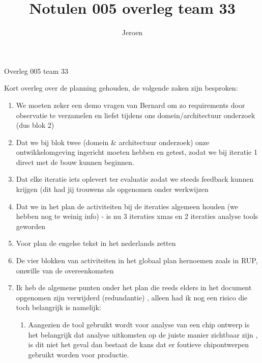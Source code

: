\documentclass{article}
\title{Notulen 005 overleg team 33}
\author{Jeroen}
\begin{document}

\begin{Minutes}{Overleg 005 team 33}

\maketitle%



Kort overleg over de planning gehouden, de volgende zaken zijn besproken:

\begin{enumerate}
 \item We moeten zeker een demo vragen van Bernard om zo requirements door observatie te verzamelen en liefst tijdens ons domein/architectuur onderzoek (dus blok 2)
 \item Dat we bij blok twee (domein \& architectuur onderzoek) onze ontwikkelomgeving ingericht moeten hebben en getest, zodat we bij iteratie 1 direct met de bouw kunnen beginnen.
 \item Dat elke iteratie iets oplevert ter evaluatie zodat we steeds feedback kunnen krijgen (dit had jij trouwens als opgenomen onder werkwijzen
 \item Dat we in het plan de activiteiten bij de iteraties algemeen houden (we hebben nog te weinig info) - is nu 3 iteraties xmas en 2 iteraties analyse tools geworden
 \item Voor plan de engelse tekst in het nederlands zetten
 \item De vier blokken van activiteiten in het globaal plan hernoemen zoals in RUP, omwille van de overeenkomsten
 \item Ik heb de algemene punten onder het plan die reeds elders in het document opgenomen zijn verwijderd (redundantie) , alleen had ik nog een risico die toch belangrijk is namelijk:
 \begin{enumerate}
  \item Aangezien de tool gebruikt wordt voor analyse van een chip ontwerp is het belangrijk dat analyse uitkomsten op de juiste manier zichtbaar zijn , is dit niet het geval dan bestaat de kans dat er foutieve chipontwerpen gebruikt worden voor productie.
 \end{enumerate}        
\end{enumerate}


\end{Minutes}
\end{document}
